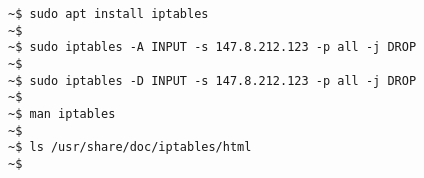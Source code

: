 \documentclass[varwidth=36em]{standalone}
\begin{document}
\begin{verbatim}
~$ sudo apt install iptables
~$ 
~$ sudo iptables -A INPUT -s 147.8.212.123 -p all -j DROP
~$ 
~$ sudo iptables -D INPUT -s 147.8.212.123 -p all -j DROP
~$ 
~$ man iptables
~$ 
~$ ls /usr/share/doc/iptables/html
~$ 
\end{verbatim}
\end{document}
